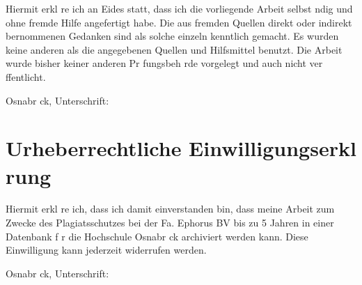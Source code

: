 \documentclass{article}
\begin{document}
\newpage
{}
\label{erklaerung}

Hiermit erkl re ich an Eides statt, dass ich die vorliegende Arbeit selbst ndig und ohne fremde Hilfe angefertigt habe. Die aus fremden Quellen direkt oder indirekt  bernommenen Gedanken sind als solche einzeln kenntlich gemacht. Es wurden keine anderen als die angegebenen Quellen und Hilfsmittel benutzt. Die Arbeit wurde bisher keiner anderen Pr fungsbeh rde vorgelegt und auch nicht ver ffentlicht.
\vspace*{2em}

Osnabr ck, \hrulefill\qquad Unterschrift: \hrulefill
\vspace*{3em}


\section*{Urheberrechtliche Einwilligungserkl rung}

Hiermit erkl re ich, dass ich damit einverstanden bin, dass meine Arbeit zum Zwecke des Plagiatsschutzes bei der Fa. Ephorus BV bis zu 5 Jahren in einer Datenbank f r die Hochschule Osnabr ck archiviert werden kann. Diese Einwilligung kann jederzeit widerrufen werden.
\vspace*{2em}

Osnabr ck, \hrulefill\qquad Unterschrift: \hrulefill
\end{document}
